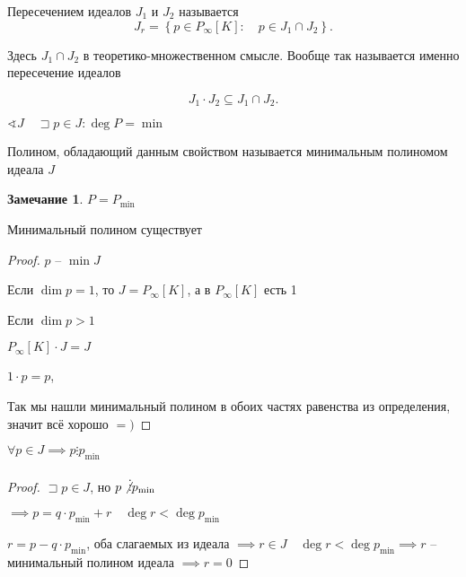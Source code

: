 \documentclass{book}
\theoremstyle{definition}
\newtheorem*{note}{Замечание}
\begin{document}
\begin{definition}
    Пересечением идеалов $J_1$ и $J_2$ называется \[
    J_r = \left\{ p\in P_{\infty }[K]:\quad p\in J_1\cap J_2 \right\} 
    .\] 

    Здесь $J_1\cap J_2$  в теоретико-множественном смысле. Вообще так называется именно пересечение идеалов
\end{definition}

\begin{problem}
    \[
    J_1\cdot J_2\subseteq J_1\cap J_2
    .\] 
\end{problem}

$\sphericalangle J\quad \sqsupset p\in J: \deg P = \min$

\begin{definition}
    Полином, обладающий данным свойством называется минимальным полиномом идеала $J$
\end{definition}

\begin{note}
    $P = P_{\min}$
\end{note}

\begin{lemma}
    Минимальный полином существует
\end{lemma}
\begin{proof}
    $p$ --  $\min J$

    Если $ \dim p = 1$, то  $J = P_{\infty }[K]$, а в  $P_{\infty }[K]$ есть 1

    Если $\dim p > 1$

     $P_{\infty }[K]  \cdot  J = J$ 

     $1 \cdot  p = p$, 

     Так мы нашли минимальный полином в обоих частях равенства из определения, значит всё хорошо $=)$
\end{proof}

\begin{lemma}
    $\forall p\in J \implies p \vdots p_{\min}$
\end{lemma}
\begin{proof}
    $\sqsupset p\in J$, но $p\not\vdots p_{\min}$

    $\implies p = q\cdot p_{\min} + r\quad \deg r < \deg p_{\min}$

    $r = p - q\cdot p_{\min}$, оба слагаемых из идеала $ \implies  r\in J\quad \deg r < \deg p_{\min} \implies r$ -- минимальный полином идеала $\implies  r = 0$
\end{proof}
\end{document}
